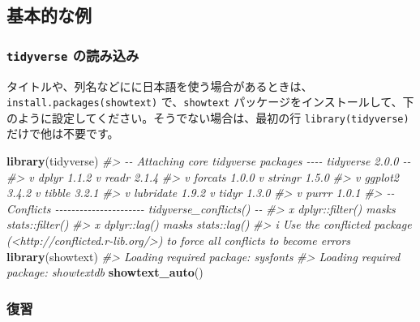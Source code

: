 \documentclass[
  xelatex, ja=standard]{bxjsbook}
\newenvironment{Shaded}{\begin{snugshade}}{\end{snugshade}}
\newcommand{\CommentTok}[1]{\textcolor[rgb]{0.56,0.35,0.01}{\textit{#1}}}
\newcommand{\FunctionTok}[1]{\textcolor[rgb]{0.13,0.29,0.53}{\textbf{#1}}}
\newcommand{\NormalTok}[1]{#1}
\theoremstyle{definition}
\theoremstyle{definition}
\theoremstyle{definition}
\theoremstyle{definition}
\theoremstyle{remark}
\begin{document}
\hypertarget{ux57faux672cux7684ux306aux4f8b}{%
\subsection{基本的な例}\label{ux57faux672cux7684ux306aux4f8b}}

\hypertarget{tidyverse-ux306eux8aadux307fux8fbcux307f}{%
\subsubsection{\texorpdfstring{\texttt{tidyverse} の読み込み}{tidyverse の読み込み}}\label{tidyverse-ux306eux8aadux307fux8fbcux307f}}

タイトルや、列名などにに日本語を使う場合があるときは、\texttt{install.packages(\textquotesingle{}showtext\textquotesingle{})} で、\texttt{showtext} パッケージをインストールして、下のように設定してください。そうでない場合は、最初の行 \texttt{library(tidyverse)} だけで他は不要です。

\begin{Shaded}
\begin{Highlighting}[]
\FunctionTok{library}\NormalTok{(tidyverse)}
\CommentTok{\#\textgreater{} {-}{-} Attaching core tidyverse packages {-}{-}{-}{-} tidyverse 2.0.0 {-}{-}}
\CommentTok{\#\textgreater{} v dplyr     1.1.2     v readr     2.1.4}
\CommentTok{\#\textgreater{} v forcats   1.0.0     v stringr   1.5.0}
\CommentTok{\#\textgreater{} v ggplot2   3.4.2     v tibble    3.2.1}
\CommentTok{\#\textgreater{} v lubridate 1.9.2     v tidyr     1.3.0}
\CommentTok{\#\textgreater{} v purrr     1.0.1     }
\CommentTok{\#\textgreater{} {-}{-} Conflicts {-}{-}{-}{-}{-}{-}{-}{-}{-}{-}{-}{-}{-}{-}{-}{-}{-}{-}{-}{-}{-}{-} tidyverse\_conflicts() {-}{-}}
\CommentTok{\#\textgreater{} x dplyr::filter() masks stats::filter()}
\CommentTok{\#\textgreater{} x dplyr::lag()    masks stats::lag()}
\CommentTok{\#\textgreater{} i Use the conflicted package (\textless{}http://conflicted.r{-}lib.org/\textgreater{}) to force all conflicts to become errors}
\FunctionTok{library}\NormalTok{(showtext) }
\CommentTok{\#\textgreater{} Loading required package: sysfonts}
\CommentTok{\#\textgreater{} Loading required package: showtextdb}
\FunctionTok{showtext\_auto}\NormalTok{()}
\end{Highlighting}
\end{Shaded}

\hypertarget{ux5fa9ux7fd2-1}{%
\subsubsection{復習}\label{ux5fa9ux7fd2-1}}
\end{document}
